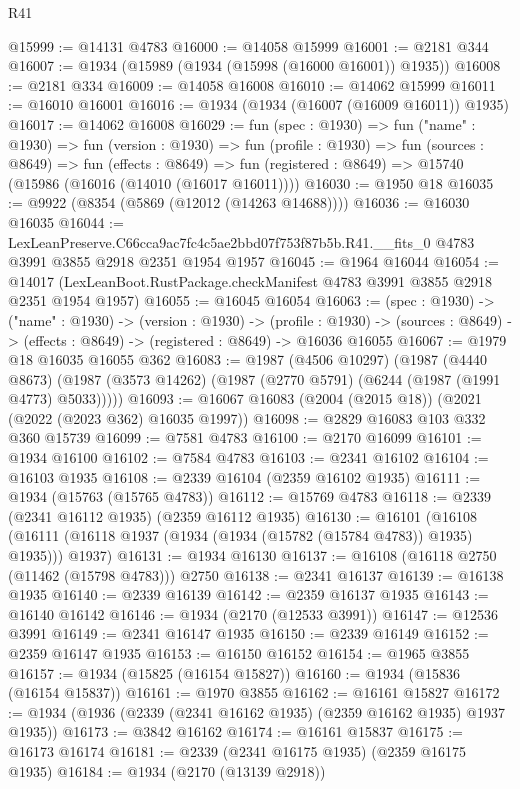 \begin{lexlean}{R41}
\begin{coremodule}
@15999 := @14131 @4783
@16000 := @14058 @15999
@16001 := @2181 @344
@16007 := @1934 (@15989 (@1934 (@15998 (@16000 @16001)) @1935))
@16008 := @2181 @334
@16009 := @14058 @16008
@16010 := @14062 @15999
@16011 := @16010 @16001
@16016 := @1934 (@1934 (@16007 (@16009 @16011)) @1935)
@16017 := @14062 @16008
@16029 := fun (spec : @1930) =>
  fun ("name" : @1930) =>
  fun (version : @1930) =>
  fun (profile : @1930) =>
  fun (sources : @8649) =>
  fun (effects : @8649) =>
  fun (registered : @8649) => @15740 (@15986 (@16016 (@14010 (@16017 @16011))))
@16030 := @1950 @18
@16035 := @9922 (@8354 (@5869 (@12012 (@14263 @14688))))
@16036 := @16030 @16035
@16044 := LexLeanPreserve.C66cca9ac7fc4c5ae2bbd07f753f87b5b.R41.__fits_0
    @4783
    @3991
    @3855
    @2918
    @2351
    @1954
    @1957
@16045 := @1964 @16044
@16054 := @14017 (LexLeanBoot.RustPackage.checkManifest @4783 @3991 @3855 @2918 @2351 @1954 @1957)
@16055 := @16045 @16054
@16063 := (spec : @1930) ->
  ("name" : @1930) ->
  (version : @1930) ->
  (profile : @1930) ->
  (sources : @8649) -> (effects : @8649) -> (registered : @8649) -> @16036 @16055
@16067 := @1979 @18 @16035 @16055 @362
@16083 := @1987
    (@4506 @10297)
    (@1987
      (@4440 @8673)
      (@1987 (@3573 @14262) (@1987 (@2770 @5791) (@6244 (@1987 (@1991 @4773) @5033)))))
@16093 := @16067 @16083 (@2004 (@2015 @18)) (@2021 (@2022 (@2023 @362) @16035 @1997))
@16098 := @2829 @16083 @103 @332 @360 @15739
@16099 := @7581 @4783
@16100 := @2170 @16099
@16101 := @1934 @16100
@16102 := @7584 @4783
@16103 := @2341 @16102
@16104 := @16103 @1935
@16108 := @2339 @16104 (@2359 @16102 @1935)
@16111 := @1934 (@15763 (@15765 @4783))
@16112 := @15769 @4783
@16118 := @2339 (@2341 @16112 @1935) (@2359 @16112 @1935)
@16130 := @16101
    (@16108 (@16111 (@16118 @1937 (@1934 (@1934 (@15782 (@15784 @4783)) @1935) @1935))) @1937)
@16131 := @1934 @16130
@16137 := @16108 (@16118 @2750 (@11462 (@15798 @4783))) @2750
@16138 := @2341 @16137
@16139 := @16138 @1935
@16140 := @2339 @16139
@16142 := @2359 @16137 @1935
@16143 := @16140 @16142
@16146 := @1934 (@2170 (@12533 @3991))
@16147 := @12536 @3991
@16149 := @2341 @16147 @1935
@16150 := @2339 @16149
@16152 := @2359 @16147 @1935
@16153 := @16150 @16152
@16154 := @1965 @3855
@16157 := @1934 (@15825 (@16154 @15827))
@16160 := @1934 (@15836 (@16154 @15837))
@16161 := @1970 @3855
@16162 := @16161 @15827
@16172 := @1934 (@1936 (@2339 (@2341 @16162 @1935) (@2359 @16162 @1935) @1937 @1935))
@16173 := @3842 @16162
@16174 := @16161 @15837
@16175 := @16173 @16174
@16181 := @2339 (@2341 @16175 @1935) (@2359 @16175 @1935)
@16184 := @1934 (@2170 (@13139 @2918))

\end{coremodule}
\end{lexlean}
